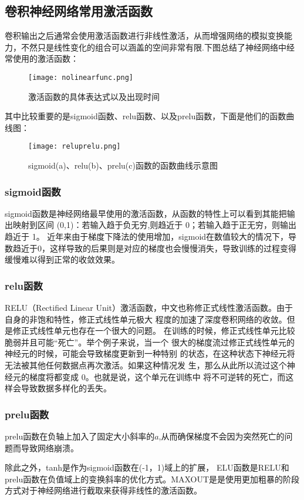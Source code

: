 \subsection{卷积神经网络常用激活函数}
卷积输出之后通常会使用激活函数进行非线性激活，从而增强网络的模拟变换能力，不然只是线性变化的组合可以涵盖的空间非常有限.下图总结了神经网络中经常使用的激活函数：
\begin{figure}[!ht]
 \centering
	\texttt{[image: nolinearfunc.png]}
	\caption{激活函数的具体表达式以及出现时间}
\end{figure}

其中比较重要的是sigmoid函数、relu函数、以及prelu函数，下面是他们的函数曲线图：
\begin{figure}[!ht]
 \centering
	\texttt{[image: reluprelu.png]}
	\caption{sigmoid(a)、relu(b)、prelu(c)函数的函数曲线示意图}
\end{figure}

\subsubsection{sigmoid函数}
sigmoid函数是神经网络最早使用的激活函数，从函数的特性上可以看到其能把输出映射到区间 (0,1)：若输入趋于负无穷,则趋近于 0；若输入趋于正无穷，则输出趋近于 1。
近年来由于梯度下降法的使用增加，sigmoid在数值较大的情况下，导数趋近于0，这样导致的后果则是对应的梯度也会慢慢消失，导致训练的过程变得缓慢难以得到正常的收敛效果。
\subsubsection{relu函数}
RELU（Rectified Linear Unit）激活函数，中文也称修正式线性激活函数。由于自身的非饱和特性，修正式线性单元极大 程度的加速了深度卷积网络的收敛。但是修正式线性单元也存在一个很大的问题。 在训练的时候，修正式线性单元比较脆弱并且可能“死亡”。举个例子来说，当一个 很大的梯度流过修正式线性单元的神经元的时候，可能会导致梯度更新到一种特别 的状态，在这种状态下神经元将无法被其他任何数据点再次激活。如果这种情况发 生，那么从此所以流过这个神经元的梯度将都变成 0。也就是说，这个单元在训练中 将不可逆转的死亡，而这样会导致数据多样化的丢失。
\subsubsection{prelu函数}
prelu函数在负轴上加入了固定大小斜率的$a$,从而确保梯度不会因为突然死亡的问题而导致网络崩溃。

除此之外，tanh是作为sigmoid函数在(-1，1)域上的扩展，
ELU函数是RELU和prelu函数在负值域上的变换斜率的优化方式。MAXOUT是是使用更加粗暴的阶段方式对于神经网络进行截取来获得非线性的激活函数。
